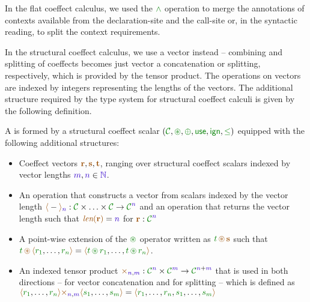 \noindent
In the flat coeffect calculus, we used the $\czip$ operation to merge the annotations of contexts
available from the declaration-site and the call-site or, in the syntactic reading, to split the 
context requirements.

In the structural coeffect calculus, we use a vector instead -- combining and splitting of 
coeffects becomes just vector a concatenation or splitting, respectively, which is provided
by the tensor product. The operations on vectors are indexed by integers representing the lengths
of the vectors. The additional structure required by the type system for structural coeffect 
calculi is given by the following definition.

\begin{definition}
A \emph{} is formed by a structural coeffect scalar 
$(\C, \cseq, \cpar, \cunit, \czero, \cleq)$ equipped with the following additional structures:

\begin{itemize}
\item Coeffect vectors $\aclrd{\textbf{r}}, \aclrd{\textbf{s}}, \aclrd{\textbf{t}}$, ranging over
  structural coeffect scalars indexed by vector lengths $\sclrd{m}, \sclrd{n} \in \sclrd{\mathbb{N}}$.

\item An operation that constructs a vector from scalars indexed by the vector length
  $\alift{-}_{\sclrd{n}} : \C \times \ldots \times \C \rightarrow \C^{\sclrd{n}}$
  and an operation that returns the vector length such that 
  $\alen{\aclrd{\textbf{r}}} = \sclrd{n}$ for $\aclrd{\textbf{r}} : \C^{\sclrd{n}}$

\item A point-wise extension of the $\cseq$ operator written as $\cclrd{t} \,\aseq\, \aclrd{\textbf{s}}$
  such that\\ $\cclrd{t} \,\aseq\, \alift{\cclrd{r_1}, \ldots, \cclrd{r_n}} = 
    \alift{\cclrd{t} \,\cseq\,\cclrd{r_1}, \ldots, \cclrd{t} \,\cseq\,\cclrd{r_n}}$.

\item An indexed tensor product $\atimes_{\sclrd{n},\sclrd{m}} : \C^{\sclrd{n}} \times \C^{\sclrd{m}} \rightarrow \C^{\sclrd{n}+\sclrd{m}}$
  that is used in both directions -- for vector concatenation and for splitting -- 
  which is defined as $\alift{\cclrd{r_1}, \ldots, \cclrd{r_n}} 
     \atimes_{\sclrd{n}, \sclrd{m}} \alift{\cclrd{s_1}, \ldots, \cclrd{s_m}}
   = \alift{\cclrd{r_1}, \ldots, \cclrd{r_n}, \cclrd{s_1}, \ldots, \cclrd{s_m}}$
\end{itemize}
\end{definition}

